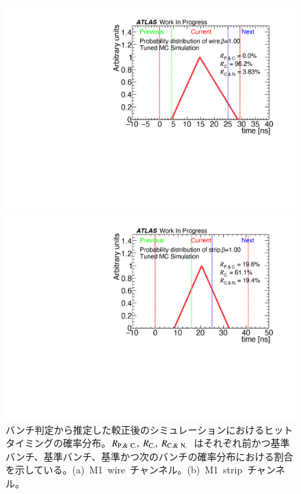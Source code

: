 \begin{figure}[H]
    \begin{minipage}{0.49\hsize}
    \centering   
    \includegraphics[width=\textwidth,page=1]{img/rec/rec_tune_w.pdf}
    \subcaption{}
    \end{minipage}
    \begin{minipage}{0.49\hsize}
    \centering   
    \includegraphics[width=\textwidth,page=1]{img/rec/rec_tune_s.pdf}
    \subcaption{}
    \end{minipage}
    \caption[バンチ判定から推定した較正後のシミュレーションにおけるヒットタイミングの確率分布]{バンチ判定から推定した較正後のシミュレーションにおけるヒットタイミングの確率分布。$R_{\rm{P.\&~C.}},~R_{\rm{C.}},~R_{\rm{C.\&~N.}}$~はそれぞれ前かつ基準バンチ、基準バンチ、基準かつ次のバンチの確率分布における割合を示している。(a)~M1~wire~チャンネル。(b)~M1~strip~チャンネル。}\label{fig:rectune}
\end{figure}

